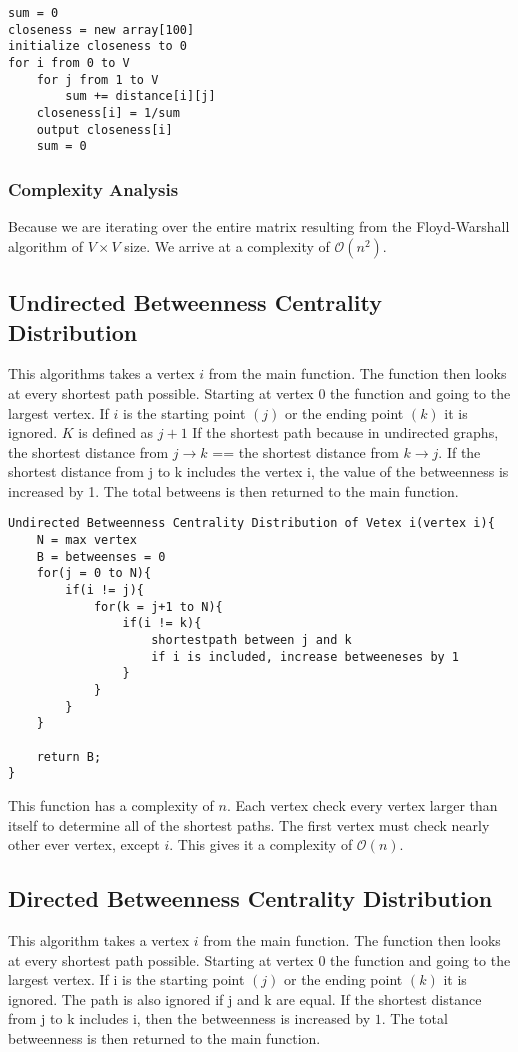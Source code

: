 \documentclass{article}
\begin{document}
\begin{verbatim}
sum = 0
closeness = new array[100]
initialize closeness to 0
for i from 0 to V
    for j from 1 to V
        sum += distance[i][j]
    closeness[i] = 1/sum
    output closeness[i]
    sum = 0
\end{verbatim}

\subsubsection{Complexity Analysis}
Because we are iterating over the entire matrix resulting from the Floyd-Warshall algorithm of $V \times V$ size. We arrive at a complexity of $\mathcal{O}(n^2)$.

\subsection{Undirected Betweenness Centrality Distribution}
This algorithms takes a vertex $i$ from the main function. The function then looks at every shortest path possible. Starting at vertex $0$ the function and going to the largest vertex. If $i$ is the starting point $(j)$ or the ending point $(k)$ it is ignored. $K$ is defined as $j + 1$ If the shortest path because in undirected graphs, the shortest distance from $j \rightarrow k$ == the shortest distance from $k \rightarrow j$. If the shortest distance from j to k includes the vertex i, the value of the betweenness is increased by 1. The total betweens is then returned to the main function.

\begin{verbatim}
Undirected Betweenness Centrality Distribution of Vetex i(vertex i){
    N = max vertex
    B = betweenses = 0
    for(j = 0 to N){
        if(i != j){
            for(k = j+1 to N){
                if(i != k){
                    shortestpath between j and k
                    if i is included, increase betweeneses by 1
                }
            }
        }
    }

    return B;
}
\end{verbatim}

This function has a complexity of $n$. Each vertex check every vertex larger than itself to determine all of the shortest paths. The first vertex must check nearly other ever vertex, except $i$. This gives it a complexity of $\mathcal{O}(n)$.

\subsection{Directed Betweenness Centrality Distribution}
This algorithm takes a vertex $i$ from the main function. The function then looks at every shortest path possible. Starting at vertex $0$ the function and going to the largest vertex. If i is the starting point $(j)$ or the ending point $(k)$ it is ignored. The path is also ignored if j and k are equal. If the shortest distance from j to k includes i, then the betweenness is increased by $1$. The total betweenness is then returned to the main function.
\end{document}
